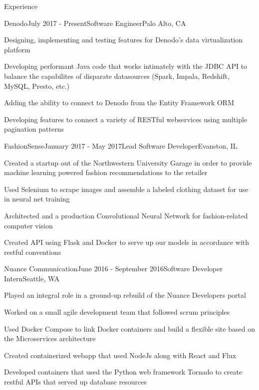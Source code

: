 \documentclass{resume} %
\begin{document}
\begin{rSection}{Experience}

\begin{rSubsection}{Denodo}{July 2017 - Present}{Software Engineer}{Palo Alto, CA}
\item Designing, implementing and testing features for Denodo's data virtualization platform
\item Developing performant Java code that works intimately with the JDBC API to balance the capabilites of disparate datasources (Spark, Impala, Redshift, MySQL, Presto, etc.)
\item Adding the ability to connect to Denodo from the Entity Framework ORM
\item Developing features to connect a variety of RESTful webservices using multiple pagination patterns
\end{rSubsection}

\begin{rSubsection}{FashionSense}{January 2017 - May 2017}{Lead Software Developer}{Evanston, IL}
\item Created a startup out of the Northwestern University Garage in order to provide machine learning powered fashion recommendations to the retailer
\item Used Selenium to scrape images and assemble a labeled clothing dataset for use in neural net training
\item Architected and a production Convolutional Neural Network for fashion-related computer vision
\item Created API using Flask and Docker to serve up our models in accordance with restful conventions
\end{rSubsection}


\begin{rSubsection}{Nuance Communication}{June 2016 - September 2016}{Software Developer Intern}{Seattle, WA}
\item Played an integral role in a ground-up rebuild of the Nuance Developers portal
\item Worked on a small agile development team that followed scrum principles
\item Used Docker Compose to link Docker containers and build a flexible site based on the
Microservices architecture
\item Created containerized webapp that used NodeJs along with React and Flux
\item Developed containers that used the Python web framework Tornado to create restful APIs that served up database resources
\end{rSubsection}


\end{rSection}
\end{document}
